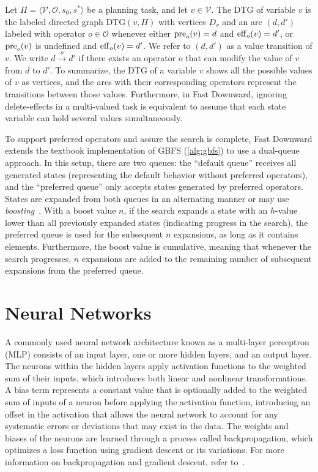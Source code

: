 \documentclass[ppgc,diss,english]{iiufrgs}
\begin{document}
Let $\Pi = \langle \mathcal{V}, \mathcal{O}, s_0, s^* \rangle$ be a \sas planning task, and let $v \in \mathcal{V}$. The DTG of variable $v$ is the labeled directed graph $\text{DTG}(v, \Pi)$ with vertices $D_v$ and an arc $(d, d')$ labeled with operator $o \in \mathcal{O}$ whenever either $\operatorname{pre}_{o}(v) = d$ and $\operatorname{eff}_{o}(v) = d'$, or $\operatorname{pre}_{o}(v)$ is undefined and $\operatorname{eff}_{o}(v) = d'$. We refer to $(d, d')$ as a value transition of $v$. We write $d \xrightarrow{o} d'$ if there exists an operator $o$ that can modify the value of $v$ from $d$ to $d'$.
To summarize, the DTG of a variable $v$ shows all the possible values of $v$ as vertices, and the arcs with their corresponding operators represent the transitions between those values. Furthermore, in Fast Downward, ignoring delete-effects in a multi-valued task is equivalent to assume that each state variable can hold several values simultaneously.

To support preferred operators and assure the search is complete, Fast Downward extends the textbook implementation of GBFS (\cref{alg:gbfs}) to use a dual-queue approach. In this setup, there are two queues: the ``default queue'' receives all generated states (representing the default behavior without preferred operators), and the ``preferred queue'' only accepts states generated by preferred operators. States are expanded from both queues in an alternating manner or may use \emph{boosting}~\cite{Richter.Helmert/2009}. With a boost value $n$, if the search expands a state with an $h$-value lower than all previously expanded states (indicating progress in the search), the preferred queue is used for the subsequent $n$ expansions, as long as it contains elements. Furthermore, the boost value is cumulative, meaning that whenever the search progresses, $n$ expansions are added to the remaining number of subsequent expansions from the preferred queue.

\section{Neural Networks}
\label{sec:background-neural-nets}
A commonly used neural network architecture known as a multi-layer perceptron (MLP) consists of an input layer, one or more hidden layers, and an output layer. The neurons within the hidden layers apply activation functions to the weighted sum of their inputs, which introduces both linear and nonlinear transformations. A bias term represents a constant value that is optionally added to the weighted sum of inputs of a neuron before applying the activation function, introducing an offset in the activation that allows the neural network to account for any systematic errors or deviations that may exist in the data. The weights and biases of the neurons are learned through a process called backpropagation, which optimizes a loss function using gradient descent or its variations. For more information on backpropagation and gradient descent, refer to~\citet{Goodfellow.etal/2016}.
\end{document}
